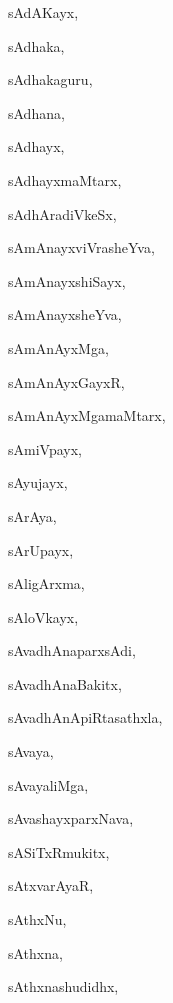 \begin{multicols}{3}
{\noindent
{sAdAKayx}, \pageref{sAdAKayx}

\noindent
{sAdhaka}, \pageref{sAdhaka}

\noindent
{sAdhakaguru}, \pageref{sAdhakaguru}

\noindent
{sAdhana}, \pageref{sAdhana}

\noindent
{sAdhayx}, \pageref{sAdhayx}

\noindent
{sAdhayxmaMtarx}, \pageref{sAdhayxmaMtarx}

\noindent
{sAdhAradiVkeSx}, \pageref{sAdhAradiVkeSx}

\noindent
{sAmAnayxviVrasheYva}, \pageref{sAmAnayxviVrasheYva}

\noindent
{sAmAnayxshiSayx}, \pageref{sAmAnayxshiSayx}

\noindent
{sAmAnayxsheYva}, \pageref{sAmAnayxsheYva}

\noindent
{sAmAnAyxMga}, \pageref{sAmAnAyxMga}

\noindent
{sAmAnAyxGayxR}, \pageref{sAmAnAyxGayxR}

\noindent
{sAmAnAyxMgamaMtarx}, \pageref{sAmAnAyxMgamaMtarx}

\noindent
{sAmiVpayx}, \pageref{sAmiVpayx}

\noindent
{sAyujayx}, \pageref{sAyujayx}

\noindent
{sArAya}, \pageref{sArAya}

\noindent
{sArUpayx}, \pageref{sArUpayx}

\noindent
{sAligArxma}, \pageref{sAligArxma}

\noindent
{sAloVkayx}, \pageref{sAloVkayx}

\noindent
{sAvadhAnaparxsAdi}, \pageref{sAvadhAnaparxsAdi}

\noindent
{sAvadhAnaBakitx}, \pageref{sAvadhAnaBakitx}

\noindent
{sAvadhAnApiRtasathxla}, \pageref{sAvadhAnApiRtasathxla}

\noindent
{sAvaya}, \pageref{sAvaya}

\noindent
{sAvayaliMga}, \pageref{sAvayaliMga}

\noindent
{sAvashayxparxNava}, \pageref{sAvashayxparxNava}

\noindent
{sASiTxRmukitx}, \pageref{sASiTxRmukitx}

\noindent
{sAtxvarAyaR}, \pageref{sAtxvarAyaR}

\noindent
{sAthxNu}, \pageref{sAthxNu}

\noindent
{sAthxna}, \pageref{sAthxna}

\noindent
{sAthxnashudidhx}, \pageref{sAthxnashudidhx}

}
\end{multicols}
